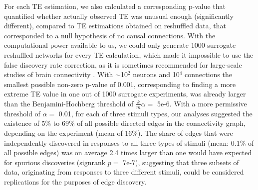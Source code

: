 \documentclass{article}
\begin{document}
For each TE estimation, we also calculated a corresponding p-value that quantified whether actually observed TE was unusual enough (significantly different), compared to TE estimations obtained on reshuffled data, that corresponded to a null hypothesis of no causal connections. With the computational power available to us, we could only generate 1000 surrogate reshuffled networks for every TE calculation, which made it impossible to use the false discovery rate correction, as it is sometimes recommended for large-scale studies of brain connectivity \citep{vicente2011te,lindner2011trentool}. With $\sim$10$^2$ neurons and 10$^4$ connections the smallest possible non-zero p-value of 0.001, corresponding to finding a more extreme TE value in one out of 1000 surrogate experiments, was already larger than the Benjamini-Hochberg threshold of $\frac{k}{m}\alpha=$ 5e-6. With a more permissive threshold of $\alpha=$ 0.01, for each of three stimuli types, our analyses suggested the existence of 5\% to 69\% of all possible directed edges in the connectivity graph, depending on the experiment (mean of 16\%). The share of edges that were independently discovered in responses to all three types of stimuli  (mean: 0.1\% of all possible edges) was on average 2.4 times larger than one would have expected for spurious discoveries (signrank $p=$ 7e-7), suggesting that three subsets of data, originating from responses to three different stimuli, could be considered replications for the purposes of edge discovery. 

\end{document}
